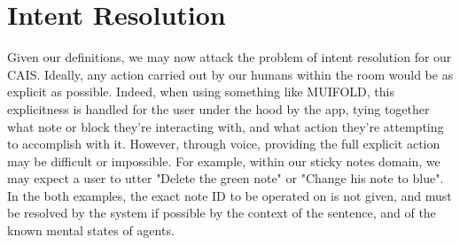 \section{Intent Resolution}

Given our definitions, we may now attack the problem of intent resolution for our CAIS.
Ideally, any action carried out by our humans within the room would be as explicit
as possible. Indeed, when using something like MUIFOLD, this explicitness is handled for
the user under the hood by the app, tying together what note or block they're interacting
with, and what action they're attempting to accomplish with it. However, through voice,
providing the full explicit action may be difficult or impossible. For example, within
our sticky notes domain, we may expect a user to utter "Delete the green note" or "Change
his note to blue". In the both examples, the exact note ID to be operated on is not given,
and must be resolved by the system if possible by the context of the sentence, and of the
known mental states of agents.
